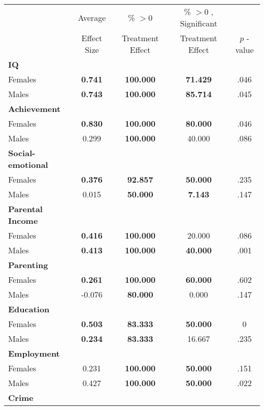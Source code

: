 \begin{tabular}{l c c c c}
\toprule
 & Average & \% $ >0 $ & \% $ >0 $ , Significant & \citet{Rosenbaum_2005_Distribution_JRSS} \\
 & Effect Size & Treatment Effect & Treatment Effect & $ p $ -value \\
\midrule
\textbf{IQ} & & & & \\
\quad Females &  \textbf{    0.741} & \textbf{  100.000} & \textbf{   71.429} & .046 \\
\quad Males &  \textbf{    0.743} & \textbf{  100.000} & \textbf{   85.714} & .045 \\
\midrule
\textbf{Achievement} & & & & \\
\quad Females &  \textbf{    0.830} & \textbf{  100.000} & \textbf{   80.000} & .046 \\
\quad Males &      0.299 & \textbf{  100.000} &    40.000 & .086 \\
\midrule
\textbf{Social-emotional} & & & & \\
\quad Females &  \textbf{    0.376} & \textbf{   92.857} & \textbf{   50.000} & .235 \\
\quad Males &      0.015 & \textbf{   50.000} & \textbf{    7.143} & .147 \\
\midrule
\textbf{Parental Income} & & & & \\
\quad Females &  \textbf{    0.416} & \textbf{  100.000} &    20.000 & .086 \\
\quad Males &  \textbf{    0.413} & \textbf{  100.000} & \textbf{   40.000} & .001 \\
\midrule
\textbf{Parenting} & & & & \\
\quad Females &  \textbf{    0.261} & \textbf{  100.000} & \textbf{   60.000} & .602 \\
\quad Males &     -0.076 & \textbf{   80.000} &     0.000 & .147 \\
\midrule
\textbf{Education} & & & & \\
\quad Females &  \textbf{    0.503} & \textbf{   83.333} & \textbf{   50.000} & 0 \\
\quad Males &  \textbf{    0.234} & \textbf{   83.333} &    16.667 & .235 \\
\midrule
\textbf{Employment} & & & & \\
\quad Females &      0.231 & \textbf{  100.000} & \textbf{   50.000} & .151 \\
\quad Males &      0.427 & \textbf{  100.000} & \textbf{   50.000} & .022 \\
\midrule
\textbf{Crime} & & & & \\

\end{tabular}
